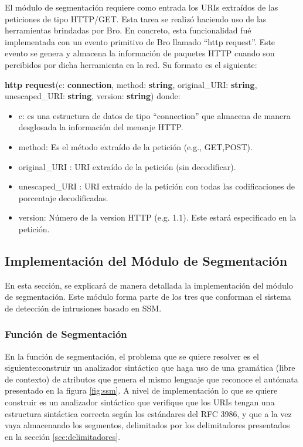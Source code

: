 El módulo de segmentación requiere como entrada los URIs extraídos de las peticiones de tipo HTTP/GET. Esta tarea se realizó haciendo uso de las herramientas brindadas por Bro. En concreto, esta funcionalidad fué implementada con un evento primitivo de Bro llamado ``http request''. Este evento se genera y almacena la información de paquetes HTTP cuando son percibidos por dicha herramienta en la red. Su formato es el siguiente:

\textbf{http request}(c: \textbf{connection}, method: \textbf{string}, original\_URI: \textbf{string},
unescaped\_URI: \textbf{string}, version: \textbf{string})
donde:
\begin{itemize}
\item c: es una estructura de datos de tipo ``connection'' que almacena de manera desglosada la información del mensaje HTTP.
\item method: Es el método extraído de la petición (e.g., GET,POST).
\item original\_URI : URI extraído de la petición (sin decodificar).
\item unescaped\_URI : URI extraído de la petición con todas las codificaciones de porcentaje decodificadas.
\item version: Número de la version HTTP (e.g. 1.1). Este estará especificado en la petición.
\end{itemize}

\subsection{Implementación del Módulo de Segmentación}

En esta sección, se explicará de manera detallada la implementación del módulo de segmentación. Este módulo forma parte de los tres que conforman el sistema de detección de intrusiones basado en SSM.

\subsubsection{Función de Segmentación}

En la función de segmentación, el problema que se quiere resolver es el siguiente:construir un analizador sintáctico que haga uso de una gramática (libre de contexto) de atributos que genera el mismo lenguaje que reconoce el autómata presentado en la figura \ref{fig:ssm}. A nivel de implementación lo que se quiere construir es un analizador sintáctico que verifique que los URIs tengan una estructura sintáctica correcta según los estándares del RFC 3986, y que a la vez vaya almacenando los segmentos, delimitados por los delimitadores presentados en la sección \ref{sec:delimitadores}.

